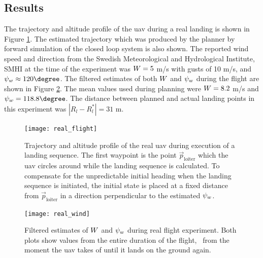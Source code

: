 \subsection{Results}
The trajectory and altitude profile of the \ac{uav} during a real landing is shown in Figure \ref{fig:real_land}. The estimated trajectory which was produced by the planner by forward simulation of the closed loop system is also shown. 
The reported wind speed and direction from the Swedish Meteorological and Hydrological Institute, SMHI at the time of the experiment was 
$W=5$ m/s with gusts of 10 m/s, and $\winddir\approx120\degree$. The filtered estimates of both $W$ and $\psi_w$ during the flight are shown in Figure \ref{fig:real_wind}. The mean values used during planning were 
$W=8.2$ m/s and $\winddir=118.8\degree$. The distance between planned and actual landing points in this experiment was $|R_l-R_l^*|=31$ m. 

 \begin{figure}
    \hspace{-0.15\textwidth}
    \texttt{[image: real\_flight]}
     \caption{Trajectory and altitude profile of the real uav during execution of a landing sequence. The first waypoint is the point $\vec{p}_{\text{loiter}}$ which the \ac{uav} circles around while the landing sequence is calculated. 
     To compensate for the unpredictable initial heading when the landing sequence is initiated, the initial state is placed at a fixed distance from $\vec{p}_{\text{loiter}}$ in a direction perpendicular to the estimated $\psi_w$.}
     \label{fig:real_land}
 \end{figure}

 \begin{figure}
    \hspace{-0.15\textwidth}
    \texttt{[image: real\_wind]}
    \caption{Filtered estimates of $W$ and $\psi_w$ during real flight experiment. Both plots show values from the entire duration of the flight, \ie\, from the moment the \ac{uav} takes of until it lands on the ground again.}
    \label{fig:real_wind}
 \end{figure}

